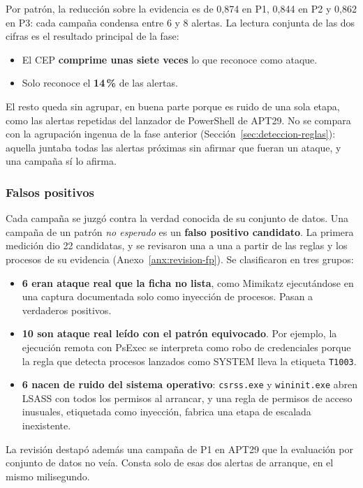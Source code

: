 Por patrón, la reducción sobre la evidencia es de 0,874 en P1, 0,844 en P2 y 0,862 en P3:
cada campaña condensa entre 6 y 8 alertas. La lectura conjunta de las dos cifras es el
resultado principal de la fase:
\begin{itemize}
    \item El CEP \textbf{comprime unas siete veces} lo que reconoce como ataque.
    \item Solo reconoce el \textbf{14\,\%} de las alertas.
\end{itemize}
El resto queda sin agrupar, en buena parte porque es ruido de una sola etapa, como las
alertas repetidas del lanzador de PowerShell de APT29. No se compara con la agrupación
ingenua de la fase anterior (Sección~\ref{sec:deteccion-reglas}): aquella juntaba todas las
alertas próximas sin afirmar que fueran un ataque, y una campaña sí lo afirma.

\subsubsection{Falsos positivos}

Cada campaña se juzgó contra la verdad conocida de su conjunto de datos. Una campaña de un
patrón \emph{no esperado} es un \textbf{falso positivo candidato}. La primera medición dio
22 candidatas, y se revisaron una a una a partir de las reglas y los procesos de su
evidencia (Anexo~\ref{anx:revision-fp}). Se clasificaron en tres grupos:
\begin{itemize}
    \item \textbf{6 eran ataque real que la ficha no lista}, como Mimikatz ejecutándose en
    una captura documentada solo como inyección de procesos. Pasan a verdaderos positivos.
    \item \textbf{10 son ataque real leído con el patrón equivocado}. Por ejemplo, la
    ejecución remota con PsExec se interpreta como robo de credenciales porque la regla que
    detecta procesos lanzados como SYSTEM lleva la etiqueta \texttt{T1003}.
    \item \textbf{6 nacen de ruido del sistema operativo}: \texttt{csrss.exe} y
    \texttt{wininit.exe} abren LSASS con todos los permisos al arrancar, y una regla de
    permisos de acceso inusuales, etiquetada como inyección, fabrica una etapa de
    escalada inexistente.
\end{itemize}
La revisión destapó además una campaña de P1 en APT29 que la evaluación por conjunto de
datos no veía. Consta solo de esas dos alertas de arranque, en el mismo milisegundo.

